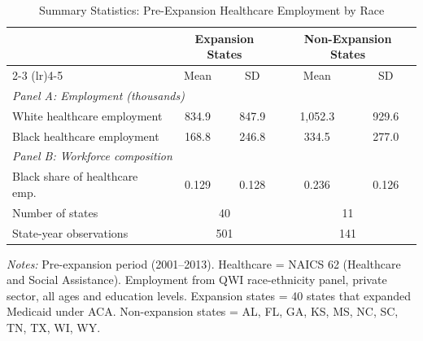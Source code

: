 \begin{table}[htbp]
\centering
\caption{Summary Statistics: Pre-Expansion Healthcare Employment by Race}
\label{tab:sumstats}
\begin{tabular}{lcccc}
\toprule
& \multicolumn{2}{c}{Expansion States} & \multicolumn{2}{c}{Non-Expansion States} \\
\cmidrule(lr){2-3} \cmidrule(lr){4-5}
& Mean & SD & Mean & SD \\
\midrule
\multicolumn{5}{l}{\textit{Panel A: Employment (thousands)}} \\[3pt]
White healthcare employment & 834.9 & 847.9 & 1,052.3 & 929.6 \\
Black healthcare employment & 168.8 & 246.8 & 334.5 & 277.0 \\
[6pt]
\multicolumn{5}{l}{\textit{Panel B: Workforce composition}} \\[3pt]
Black share of healthcare emp. & 0.129 & 0.128 & 0.236 & 0.126 \\
[6pt]
\midrule
Number of states & \multicolumn{2}{c}{40} & \multicolumn{2}{c}{11} \\
State-year observations & \multicolumn{2}{c}{501} & \multicolumn{2}{c}{141} \\
\bottomrule
\end{tabular}
\begin{tablenotes}
\small
\item \textit{Notes:} Pre-expansion period (2001--2013). Healthcare = NAICS 62 (Healthcare and Social Assistance). Employment from QWI race-ethnicity panel, private sector, all ages and education levels. Expansion states = 40 states that expanded Medicaid under ACA. Non-expansion states = AL, FL, GA, KS, MS, NC, SC, TN, TX, WI, WY.
\end{tablenotes}
\end{table}
